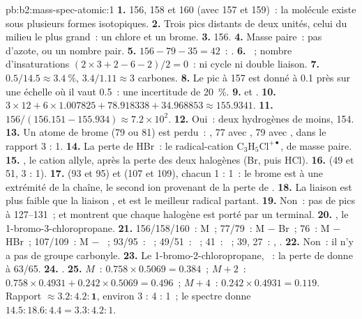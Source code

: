 \begin{solution}{pb:b2:mass-spec-atomic:1}
\textbf{1.} 156, 158 et 160 (avec 157 et 159)~: la molécule existe sous plusieurs formes isotopiques.
\textbf{2.} Trois pics distants de deux unités, celui du milieu le plus grand~: un chlore et un brome.
\textbf{3.} 156.
\textbf{4.} Masse paire~: pas d'azote, ou un nombre pair.
\textbf{5.} $156 - 79 - 35 = 42$~: .
\textbf{6.} ~; nombre d'insaturations $(2 \times 3 + 2 - 6 - 2)/2 = 0$~: ni cycle ni double
liaison.
\textbf{7.} $0.5/14.5 \approx 3.4~\%$, $3.4/1.11 \approx 3$ carbones.
\textbf{8.} Le pic à 157 est donné à 0.1 près sur une échelle où il vaut 0.5~: une incertitude de 20~\%.
\textbf{9.}  et .
\textbf{10.} $3 \times 12 + 6 \times 1.007825 + 78.918338 + 34.968853 \approx 155.9341$.
\textbf{11.} $156/(156.151 - 155.934) \approx 7.2 \times 10^2$.
\textbf{12.} Oui~: deux hydrogènes de moins, 154.
\textbf{13.} Un atome de brome (79 ou 81) est perdu~: , 77 avec , 79 avec ,
dans le rapport 3 : 1.
\textbf{14.} La perte de HBr~: le radical-cation $\mathrm{C_3H_5Cl^{+\bullet}}$, de masse paire.
\textbf{15.} , le cation allyle, après la perte des deux halogènes (Br, puis HCl).
\textbf{16.}  (49 et 51, 3 : 1).
\textbf{17.}  (93 et 95) et  (107 et 109), chacun 1 : 1~: le brome est à une extrémité de
la chaîne, le second ion provenant de la perte de .
\textbf{18.} La liaison  est plus faible que la liaison , et  est le meilleur radical
partant.
\textbf{19.} Non~: pas de pics à 127--131~;  et  montrent que chaque halogène est porté
par un  terminal.
\textbf{20.} , le 1-bromo-3-chloropropane.
\textbf{21.} 156/158/160~: M~; 77/79~: M $-$ Br~; 76~: M $-$ HBr~; 107/109~: M $-$ ~;
93/95~: ~; 49/51~: ~; 41~: ~; 39, 27~: , .
\textbf{22.} Non~: il n'y a pas de groupe carbonyle.
\textbf{23.} Le 1-bromo-2-chloropropane, ~: la perte de  donne  à 63/65.
\textbf{24.} .
\textbf{25.} $M$~: $0.758 \times 0.5069 = 0.384$~; $M+2$~: $0.758 \times 0.4931 + 0.242 \times 0.5069 =
0.496$~; $M+4$~: $0.242 \times 0.4931 = 0.119$. Rapport $\boldsymbol{\approx 3.2 : 4.2 : 1}$, environ 3 : 4 :
1~; le spectre donne $14.5 : 18.6 : 4.4 = 3.3 : 4.2 : 1$.
\end{solution}
